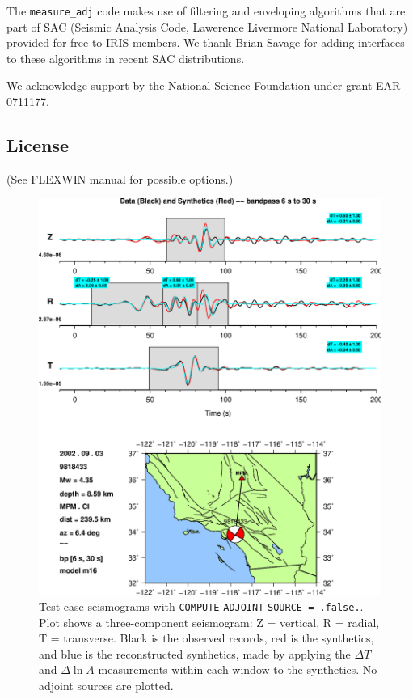 \documentclass[11pt,titlepage,fleqn]{article}
\begin{document}
The \verb+measure_adj+ code makes use of filtering and enveloping algorithms that are part of SAC (Seismic Analysis Code, Lawerence Livermore National Laboratory) provided for free to IRIS members.  We thank Brian Savage for adding interfaces to these algorithms in recent SAC distributions.

We acknowledge support by the National Science Foundation under grant EAR-0711177.


\subsection{License}

(See FLEXWIN manual for possible options.)

\pagebreak
\begin{spacing}{1}

%

\end{spacing}

\begin{figure}
\includegraphics[width=17cm]{9818433_T006_T030_MPM_CI_m16_win.eps}
\caption[]
{{
Test case seismograms with {\tt COMPUTE$\_$ADJOINT$\_$SOURCE = .false.}.  Plot shows a three-component seismogram: Z = vertical, R = radial, T = transverse.  Black is the observed records, red is the synthetics, and blue is the reconstructed synthetics, made by applying the $\Delta T$ and $\Delta \ln A$ measurements within each window to the synthetics.  No adjoint sources are plotted.
\label{fig:noadj}
}}
\end{figure}
\end{document}
